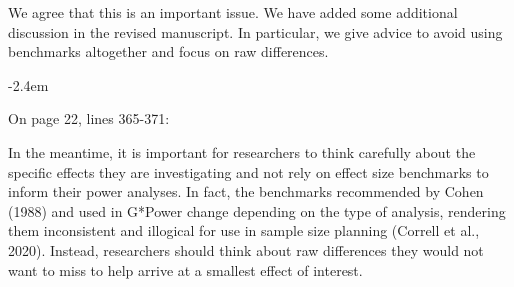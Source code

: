 \documentclass[final]{article}
\renewenvironment{quote}{\begin{fquote}\advance\leftmargini -2.4em\begin{oldquote}}{\end{oldquote}\end{fquote}}
\newenvironment{fquote}
  {\def\FrameCommand{
	\fboxsep=0.6em %
	\fcolorbox{black}{white}}%
    \MakeFramed {\advance\hsize-2\width \FrameRestore}
    \begin{minipage}{\linewidth}
  }
  {\end{minipage}\endMakeFramed}
\begin{document}
We agree that this is an important issue. We have added some additional discussion in the revised manuscript. In particular, we give advice to avoid using benchmarks altogether and focus on raw differences.

\begin{quote}
On page 22, lines 365-371:

In the meantime, it is important for researchers to think carefully about the specific effects they are investigating and not rely on effect size benchmarks to inform their power analyses. In fact, the benchmarks recommended by Cohen (1988) and used in G*Power change depending on the type of analysis, rendering them inconsistent and illogical for use in sample size planning (Correll et al., 2020). Instead, researchers should think about raw differences they would not want to miss to help arrive at a smallest effect of interest.
\end{quote}
\end{document}
